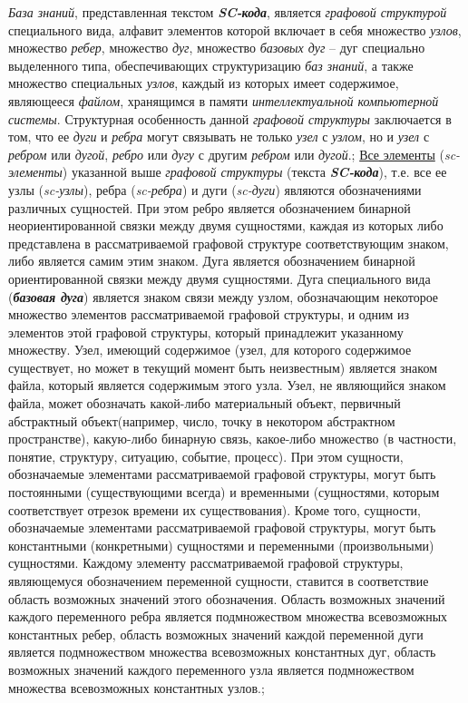 \begin{SCn}
{\textit{База знаний}, представленная текстом \textit{\textbf{SC-кода}}, является \textit{графовой структурой} специального вида, алфавит элементов которой включает в себя множество \textit{узлов}, множество \textit{ребер}, множество \textit{дуг}, множество \textit{базовых дуг} -- дуг специально выделенного типа, обеспечивающих структуризацию \textit{баз знаний}, а также множество специальных \textit{узлов}, каждый из которых имеет содержимое, являющееся \textit{файлом}, хранящимся в памяти \textit{интеллектуальной компьютерной системы}. Структурная особенность данной \textit{графовой структуры} заключается в том, что ее \textit{дуги} и \textit{ребра} могут связывать не только \textit{узел} с \textit{узлом}, но и \textit{узел} с \textit{ребром} или \textit{дугой}, \textit{ребро} или \textit{дугу} с другим \textit{ребром} или \textit{дугой}.;
\uline{Все элементы} (\textit{sc-элементы}) указанной выше \textit{графовой структуры} (текста \textit{\textbf{SC-кода}}), т.е. все ее узлы (\textit{sc-узлы}), ребра (\textit{sc-ребра}) и дуги (\textit{sc-дуги}) являются обозначениями различных сущностей. При этом ребро является обозначением бинарной неориентированной связки между двумя сущностями, каждая из которых либо представлена в рассматриваемой графовой структуре соответствующим знаком, либо является самим этим знаком. Дуга является обозначением бинарной ориентированной связки между двумя сущностями. Дуга специального вида (\textit{\textbf{базовая дуга}}) является знаком связи между узлом, обозначающим некоторое множество элементов рассматриваемой графовой структуры, и одним из элементов этой графовой структуры, который принадлежит указанному множеству. Узел, имеющий содержимое (узел, для которого содержимое существует, но может в текущий момент быть неизвестным) является знаком файла, который является содержимым этого узла. Узел, не являющийся знаком файла, может обозначать какой-либо материальный объект, первичный абстрактный объект(например, число, точку в некотором абстрактном пространстве), какую-либо бинарную связь, какое-либо множество (в частности, понятие, структуру, ситуацию, событие, процесс). При этом сущности, обозначаемые элементами рассматриваемой графовой структуры, могут быть постоянными (существующими всегда) и временными (сущностями, которым соответствует отрезок времени их существования). Кроме того, сущности, обозначаемые элементами рассматриваемой графовой структуры, могут быть константными (конкретными) сущностями и переменными (произвольными) сущностями. Каждому элементу рассматриваемой графовой структуры, являющемуся обозначением переменной сущности, ставится в соответствие область возможных значений этого обозначения. Область возможных значений каждого переменного ребра является подмножеством множества всевозможных константных ребер, область возможных значений каждой переменной дуги является подмножеством множества всевозможных константных дуг, область возможных значений каждого переменного узла является подмножеством множества всевозможных константных узлов.;
}
\end{SCn}

